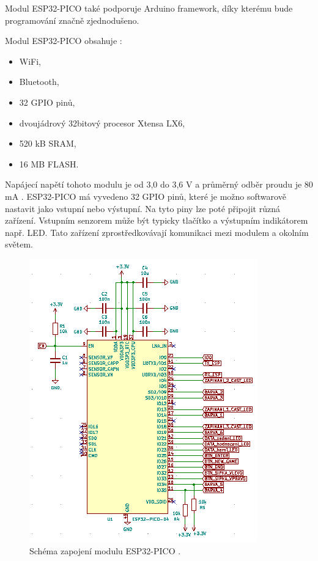 Modul ESP32-PICO také podporuje Arduino framework, díky kterému bude programování značně zjednodušeno.

Modul ESP32-PICO obsahuje \cite{PICO_datasheet}: 
\begin{itemize}
    \item WiFi,
    \item Bluetooth, %
    \item 32 GPIO pinů, %
    \item dvoujádrový 32bitový procesor Xtensa LX6,
    \item 520 kB SRAM, %
    \item 16 MB FLASH. %
  \end{itemize}

  Napájecí napětí tohoto modulu je od 3,0 do 3,6 V a průměrný odběr proudu je 80 mA \cite{PICO_datasheet}. ESP32-PICO má vyvedeno 32 GPIO pinů, které je 
  možno softwarově nastavit jako vstupní nebo výstupní. Na tyto piny lze poté připojit různá zařízení. Vstupním senzorem může 
  být typicky tlačítko a výstupním indikátorem např. LED. Tato zařízení zprostředkovávají komunikaci mezi modulem a okolním 
  světem.

  \begin{figure}[!h]
    \begin{center}
      \includegraphics[scale=1]{obrazky/ESP32_PICO_schema.png}
    \end{center}
    \caption[Schéma zapojení modulu ESP32-PICO]{Schéma zapojení modulu ESP32-PICO \cite{PICO_datasheet}.}
  \end{figure}

